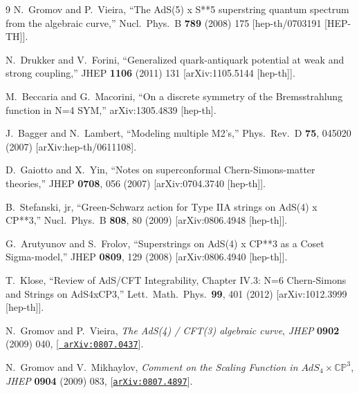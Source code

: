 \documentclass[a4paper,11pt]{article}
\numberwithin{equation}{section}
\begin{document}
\begin{thebibliography} {9}
  N.~Gromov and P.~Vieira,
  ``The AdS(5) x S**5 superstring quantum spectrum from the algebraic curve,''
  Nucl.\ Phys.\ B {\bf 789} (2008) 175
  [hep-th/0703191 [HEP-TH]].

  N.~Drukker and V.~Forini,
  ``Generalized quark-antiquark potential at weak and strong coupling,''
  JHEP {\bf 1106} (2011) 131
  [arXiv:1105.5144 [hep-th]].

  M.~Beccaria and G.~Macorini,
  ``On a discrete symmetry of the Bremsstrahlung function in N=4 SYM,''
  arXiv:1305.4839 [hep-th].

  J.~Bagger and N.~Lambert,
  ``Modeling multiple M2's,''
  Phys.\ Rev.\  D {\bf 75}, 045020 (2007)
  [arXiv:hep-th/0611108].

D.~Gaiotto and X.~Yin,
  ``Notes on superconformal Chern-Simons-matter theories,''
  JHEP {\bf 0708}, 056 (2007)
  [arXiv:0704.3740 [hep-th]]. 

  B.~Stefanski, jr,
  ``Green-Schwarz action for Type IIA strings on AdS(4) x CP**3,''
  Nucl.\ Phys.\ B {\bf 808}, 80 (2009)
  [arXiv:0806.4948 [hep-th]].

  G.~Arutyunov and S.~Frolov,
  ``Superstrings on AdS(4) x CP**3 as a Coset Sigma-model,''
  JHEP {\bf 0809}, 129 (2008)
  [arXiv:0806.4940 [hep-th]].

  T.~Klose,
  ``Review of AdS/CFT Integrability, Chapter IV.3: N=6 Chern-Simons and Strings on AdS4xCP3,''
  Lett.\ Math.\ Phys.\  {\bf 99}, 401 (2012)
  [arXiv:1012.3999 [hep-th]].

N.~Gromov and P.~Vieira, {\it {The AdS(4) / CFT(3) algebraic curve}},  {\em
  JHEP} {\bf 0902} (2009) 040, [\href{http://xxx.lanl.gov/abs/0807.0437}{{\tt
  arXiv:0807.0437}}].

N.~Gromov and V.~Mikhaylov, {\it {Comment on the Scaling Function in
  $AdS_{4}\times \mathbb{CP}^{3}$}},  {\em JHEP} {\bf 0904} (2009) 083,
  [\href{http://xxx.lanl.gov/abs/0807.4897}{{\tt arXiv:0807.4897}}].


\end{thebibliography}
\end{document}
